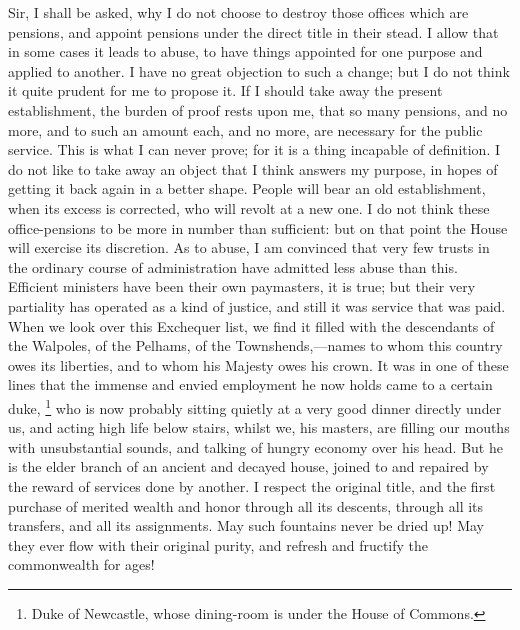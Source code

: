 Sir, I shall be asked, why I do not choose to destroy those offices which are pensions, and appoint pensions under the direct title in their stead. I allow that in some cases it leads to abuse, to have things appointed for one purpose and applied to another. I have no great objection to such a change; but I do not think it quite prudent for me to propose it. If I should take away the present establishment, the burden of proof rests upon me, that so many pensions, and no more, and to such an amount each, and no more, are necessary for the public service. This is what I can never prove; for it is a thing incapable of definition. I do not like to take away an object that I think answers my purpose, in hopes of getting it back again in a better shape. People will bear an old establishment, when its excess is corrected, who will revolt at a new one. I do not think these office-pensions to be more in number than sufficient: but on that point the House will exercise its discretion. As to abuse, I am convinced that very few trusts in the ordinary course of administration have admitted less abuse than this. Efficient ministers have been their own paymasters, it is true; but their very partiality has operated as a kind of justice, and still it was service that was paid. When we look over this Exchequer list, we find it filled with the descendants of the Walpoles, of the Pelhams, of the Townshends,—names to whom this country owes its liberties, and to whom his Majesty owes his crown. It was in one of these lines that the immense and envied employment he now holds came to a certain duke, 
\footnote{ Duke of Newcastle, whose dining-room is under the House of Commons.}
 who is now probably sitting quietly at a very good dinner directly under us, and acting high life below stairs, whilst we, his masters, are filling our mouths with unsubstantial sounds, and talking of hungry economy over his head. But he is the elder branch of an ancient and decayed house, joined to and repaired by the reward of services done by another. I respect the original title, and the first purchase of merited wealth and honor through all its descents, through all its transfers, and all its assignments. May such fountains never be dried up! May they ever flow with their original purity, and refresh and fructify the commonwealth for ages!

